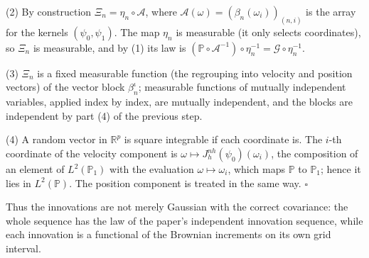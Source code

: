 \documentclass[11pt,a4paper]{article}
\begin{document}
(2) By construction \(\Xi_n=\eta_n\circ\mathcal A\), where \(\mathcal A(\omega)=(\beta_n(\omega_i))_{(n,i)}\) is the array for the kernels \((\psi_0,\psi_1)\). The map \(\eta_n\) is measurable (it only selects coordinates), so \(\Xi_n\) is measurable, and by (1) its law is \((\mathbb P\circ\mathcal A^{-1})\circ\eta_n^{-1}=\mathcal G\circ\eta_n^{-1}\).




(3) \(\Xi_n\) is a fixed measurable function (the regrouping into velocity and position vectors) of the vector block \(\beta^\iota_n\); measurable functions of mutually independent variables, applied index by index, are mutually independent, and the blocks are independent by part (4) of the previous step.




(4) A random vector in \(\mathbb R^p\) is square integrable if each coordinate is. The \(i\)-th coordinate of the velocity component is \(\omega\mapsto J^{nh}_h(\psi_0)(\omega_i)\), the composition of an element of \(L^2(\mathbb P_1)\) with the evaluation \(\omega\mapsto\omega_i\), which maps \(\mathbb P\) to \(\mathbb P_1\); hence it lies in \(L^2(\mathbb P)\). The position component is treated in the same way. \(\square\)




Thus the innovations are not merely Gaussian with the correct covariance: the whole sequence has the law of the paper's independent innovation sequence, while each innovation is a functional of the Brownian increments on its own grid interval.
\end{document}
